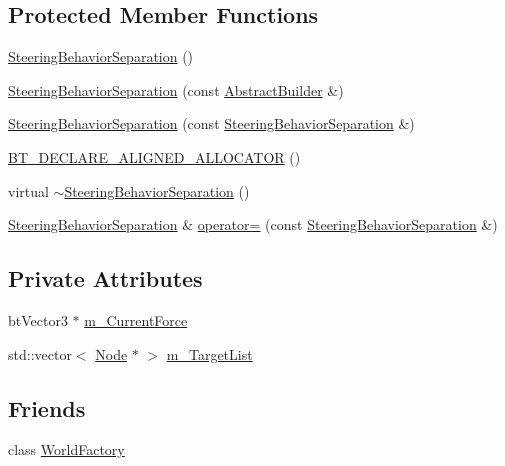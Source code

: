 \subsection*{Protected Member Functions}
\begin{DoxyCompactItemize}
\item 
\mbox{\hyperlink{classnjli_1_1_steering_behavior_separation_a4c004ddd7e64f40c43389d30921287a4}{Steering\+Behavior\+Separation}} ()
\item 
\mbox{\hyperlink{classnjli_1_1_steering_behavior_separation_a0feb8acf50740970a75ea3fffe7fb8a2}{Steering\+Behavior\+Separation}} (const \mbox{\hyperlink{classnjli_1_1_abstract_builder}{Abstract\+Builder}} \&)
\item 
\mbox{\hyperlink{classnjli_1_1_steering_behavior_separation_a3fe4124040fb2f1d40bdfb9f1a1b20ab}{Steering\+Behavior\+Separation}} (const \mbox{\hyperlink{classnjli_1_1_steering_behavior_separation}{Steering\+Behavior\+Separation}} \&)
\item 
\mbox{\hyperlink{classnjli_1_1_steering_behavior_separation_a2765217f2a60c2c185aa7672ed96fa6c}{B\+T\+\_\+\+D\+E\+C\+L\+A\+R\+E\+\_\+\+A\+L\+I\+G\+N\+E\+D\+\_\+\+A\+L\+L\+O\+C\+A\+T\+OR}} ()
\item 
virtual \mbox{\hyperlink{classnjli_1_1_steering_behavior_separation_a07ec904e8f8602e7a45d7d3bd379f902}{$\sim$\+Steering\+Behavior\+Separation}} ()
\item 
\mbox{\hyperlink{classnjli_1_1_steering_behavior_separation}{Steering\+Behavior\+Separation}} \& \mbox{\hyperlink{classnjli_1_1_steering_behavior_separation_ab1903a1f26ca1d21e21f5610432cd94e}{operator=}} (const \mbox{\hyperlink{classnjli_1_1_steering_behavior_separation}{Steering\+Behavior\+Separation}} \&)
\end{DoxyCompactItemize}
\subsection*{Private Attributes}
\begin{DoxyCompactItemize}
\item 
bt\+Vector3 $\ast$ \mbox{\hyperlink{classnjli_1_1_steering_behavior_separation_afb1844caaca319b85261cbd06671a4ff}{m\+\_\+\+Current\+Force}}
\item 
std\+::vector$<$ \mbox{\hyperlink{classnjli_1_1_node}{Node}} $\ast$ $>$ \mbox{\hyperlink{classnjli_1_1_steering_behavior_separation_a06801f704eb22a588613cbc1e5fc51a2}{m\+\_\+\+Target\+List}}
\end{DoxyCompactItemize}
\subsection*{Friends}
\begin{DoxyCompactItemize}
\item 
class \mbox{\hyperlink{classnjli_1_1_steering_behavior_separation_acb96ebb09abe8f2a37a915a842babfac}{World\+Factory}}
\end{DoxyCompactItemize}
